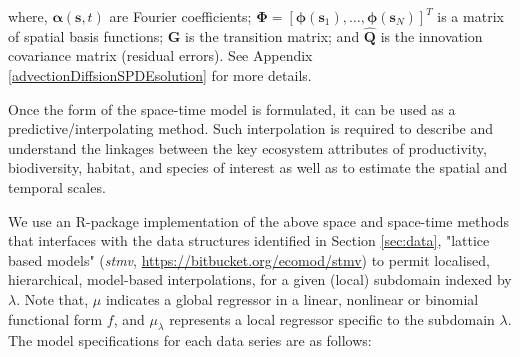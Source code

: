 \documentclass[letterpaper,portrait,11pt]{scrartcl}
\numberwithin{equation}{section}    %
\numberwithin{figure}{section}    %
\numberwithin{table}{section}       %
\begin{document}
  where, $\bm{\alpha} (\bm{s},t)$ are Fourier coefficients; $\bm{\Phi}=[ \bm{\phi}(\bm{s}_1), \dots, \bm{\phi}(\bm{s}_N) ]^T$ is a matrix of spatial basis functions; $\bm{G}$ is the transition matrix; and $\bm{\hat{Q}}$ is the innovation covariance matrix (residual errors). See Appendix \ref{advectionDiffsionSPDEsolution} for more details.
  
  
Once the form of the space-time model is formulated, it can be used as a predictive/interpolating method. Such interpolation is required to describe and understand the linkages between the key ecosystem attributes of productivity, biodiversity, habitat, and  species of interest as well as to estimate the spatial and temporal scales. 

We use an R-package implementation of the above space and space-time methods that interfaces with the data structures identified in Section \ref{sec:data}, "lattice based models" (\textit{stmv},  \url{https://bitbucket.org/ecomod/stmv}) to permit localised, hierarchical, model-based interpolations, for a given (local) subdomain indexed by $\lambda$. Note that, $\mu$ indicates a global regressor in a linear, nonlinear or binomial functional form $f$, and $\mu_\lambda$ represents a local regressor specific to the subdomain $\lambda$. The model specifications for each data series are as follows:
\end{document}
